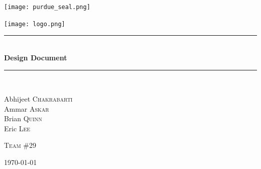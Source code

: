 \begin{titlepage}
\begin{center}

\newcommand{\HRule}{\rule{\linewidth}{0.5mm}}

\texttt{[image: purdue\_seal.png]}~\\[1cm]

\vspace{10mm}


\texttt{[image: logo.png]}~\\[1cm]

\HRule \\[0.4cm]
{ \huge \bfseries Design Document \\[0.4cm] }

\HRule \\[1.5cm]

\noindent
\begin{minipage}{0.4\textwidth}
\begin{flushleft} \large
Abhijeet \textsc{Chakrabarti}\\
Ammar \textsc{Askar}\\
Brian \textsc{Quinn}\\
Eric \textsc{Lee}
\end{flushleft}
\end{minipage}%
\begin{minipage}{0.4\textwidth}
\begin{flushright} \large
\textsc{Team }\#29
\end{flushright}
\end{minipage}

\vfill

{\large \today}

\end{center}
\end{titlepage}